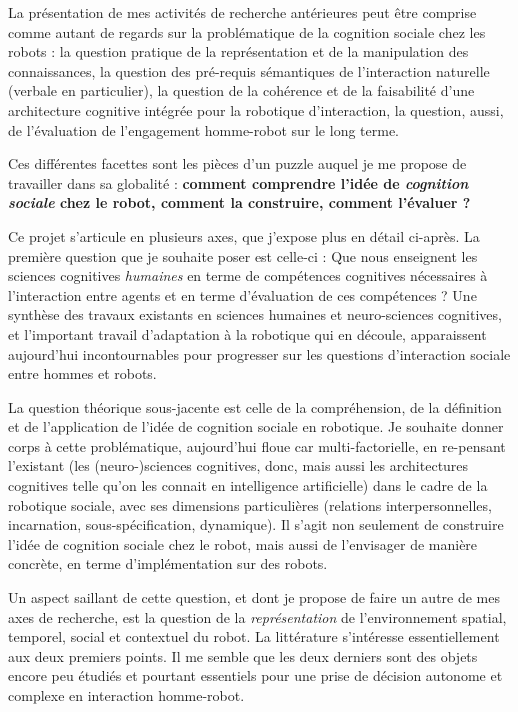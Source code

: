 \documentclass[a4paper]{article}
\begin{document}
La présentation de mes activités de recherche antérieures peut être comprise comme
autant de regards sur la problématique de la cognition sociale chez les robots : la
question pratique de la représentation et de la manipulation des connaissances,
la question des pré-requis sémantiques de l'interaction naturelle (verbale en
particulier), la question de la cohérence et de la faisabilité d'une
architecture cognitive intégrée pour la robotique d'interaction, la question,
aussi, de l'évaluation de l'engagement homme-robot sur le long terme.

Ces différentes facettes sont les pièces d'un puzzle auquel je me propose de
travailler dans sa globalité : \textbf{comment comprendre l'idée de \emph{cognition
sociale} chez le robot, comment la construire, comment l'évaluer ?}

Ce projet s'articule en plusieurs axes, que j'expose plus en détail ci-après.
La première question que je souhaite poser est celle-ci : Que nous enseignent
les sciences cognitives \emph{humaines} en terme de compétences cognitives
nécessaires à l'interaction entre agents et en terme d'évaluation de ces
compétences ? Une synthèse des travaux existants en sciences humaines et
neuro-sciences cognitives, et l'important travail d'adaptation à la robotique
qui en découle, apparaissent aujourd'hui incontournables pour progresser sur les
questions d'interaction sociale entre hommes et robots.

La question théorique sous-jacente est celle de la compréhension, de la
définition et de l'application de l'idée de cognition sociale en robotique. Je
souhaite donner corps à cette problématique, aujourd'hui floue car
multi-factorielle, en re-pensant l'existant (les (neuro-)sciences cognitives, donc,
mais aussi les architectures cognitives telle qu'on les connait en intelligence
artificielle) dans le cadre de la robotique sociale, avec ses dimensions
particulières (relations interpersonnelles, incarnation, sous-spécification,
dynamique). Il s'agit non seulement de construire l'idée de cognition sociale
chez le robot, mais aussi de l'envisager de manière concrète, en terme
d'implémentation sur des robots.

Un aspect saillant de cette question, et dont je propose de faire un autre de
mes axes de recherche, est la question de la \emph{représentation} de
l'environnement spatial, temporel, social et contextuel du robot. La littérature
s'intéresse essentiellement aux deux premiers points. Il me semble que les deux
derniers sont des objets encore peu étudiés et pourtant essentiels pour une
prise de décision autonome et complexe en interaction homme-robot.
\end{document}
